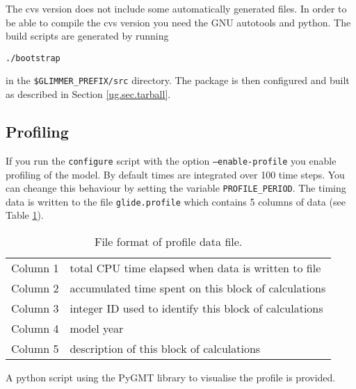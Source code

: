 The cvs version does not include some automatically generated files. In order to be able to compile the cvs version you need the GNU autotools and python. The build scripts are generated by running
\begin{verbatim}
./bootstrap
\end{verbatim}
in the \texttt{\$GLIMMER\_PREFIX/src} directory. The package is then configured and built as described in Section \ref{ug.sec.tarball}.
%
\subsection{Profiling}\label{ug.sec.profile}
If you run the \texttt{configure} script with the option \texttt{--enable-profile} you enable profiling of the model. By default times are integrated over 100 time steps. You can cheange this behaviour by setting the variable \texttt{PROFILE\_PERIOD}. The timing data is written to the file \texttt{glide.profile} which contains 5 columns of data (see Table \ref{ug.tab.profile_format}).
\begin{table}[htbp]
  \centering
  \begin{tabular}{|l|l|}
    \hline
    Column 1 &total CPU time elapsed when data is written to file\\
    Column 2 &accumulated time spent on this block of calculations\\
    Column 3 &integer ID used to identify this block of calculations\\
    Column 4 &model year\\
    Column 5 &description of this block of calculations\\
    \hline
  \end{tabular}
  \caption{File format of profile data file.}
  \label{ug.tab.profile_format}
\end{table}
A python script using the PyGMT library to visualise the profile is provided.
%
